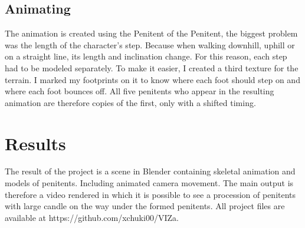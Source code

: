 \documentclass[12pt,a4paper,titlepage,final,tikz,border=4mm]{report}
\begin{document}
\subsection{Animating}
The animation is created using the Penitent of the Penitent, the biggest problem was the length of the character's step. Because when walking downhill, uphill or on a straight line, its length and inclination change. For this reason, each step had to be modeled separately. To make it easier, I created a third texture for the terrain. I marked my footprints on it to know where each foot should step on and where each foot bounces off. All five penitents who appear in the resulting animation are therefore copies of the first, only with a shifted timing.

\section{Results}
The result of the project is a scene in Blender containing skeletal animation and models of penitents. Including animated camera movement. The main output is therefore a video rendered in which it is possible to see a procession of penitents with large candle on the way under the formed penitents. All project files are available at https://github.com/xchuki00/VIZa.
\end{document}
